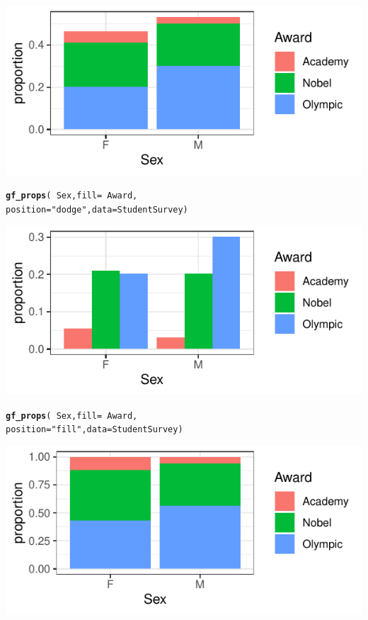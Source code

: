 \documentclass[10pt]{report}\usepackage[]{graphicx}\usepackage[]{xcolor}
\makeatletter
\newcommand{\hlsng}[1]{\textcolor[rgb]{0.192,0.494,0.8}{#1}}%
\newcommand{\hlopt}[1]{\textcolor[rgb]{0,0,0}{#1}}%
\newcommand{\hldef}[1]{\textcolor[rgb]{0.345,0.345,0.345}{#1}}%
\newcommand{\hlkwc}[1]{\textcolor[rgb]{0.333,0.667,0.333}{#1}}%
\newcommand{\hlkwd}[1]{\textcolor[rgb]{0.737,0.353,0.396}{\textbf{#1}}}%
\newenvironment{kframe}{%
 \def\at@end@of@kframe{}%
 \ifinner\ifhmode%
  \def\at@end@of@kframe{\end{minipage}}%
  \begin{minipage}{\columnwidth}%
 \fi\fi%
 \def\FrameCommand##1{\hskip\@totalleftmargin \hskip-\fboxsep
 \colorbox{shadecolor}{##1}\hskip-\fboxsep
     \hskip-\linewidth \hskip-\@totalleftmargin \hskip\columnwidth}%
 \MakeFramed {\advance\hsize-\width
   \@totalleftmargin\z@ \linewidth\hsize
   \@setminipage}}%
 {\par\unskip\endMakeFramed%
 \at@end@of@kframe}
\newenvironment{knitrout}{}{} %
\makeatother
\begin{document}
\begin{multicols}{3}
\begin{knitrout}
{\centering \includegraphics[width=.25\textwidth,height=.125\textwidth]{figure/unnamed-chunk-26-1} 

}


\end{knitrout}
\vspace*{-.20in}

\begin{knitrout}\small
{}\color{fgcolor}\begin{kframe}
\begin{alltt}
\hlkwd{gf_props}\hldef{(}\hlopt{~}\hldef{Sex,} \hlkwc{fill} \hldef{=} \hlopt{~}\hldef{Award,}
         \hlkwc{position} \hldef{=} \hlsng{"dodge"}\hldef{,} \hlkwc{data}\hldef{=StudentSurvey)}
\end{alltt}
\end{kframe}

{\centering \includegraphics[width=.25\textwidth,height=.125\textwidth]{figure/unnamed-chunk-27-1} 

}


\end{knitrout}
\columnbreak
\begin{knitrout}\small
{}\color{fgcolor}\begin{kframe}
\begin{alltt}
\hlkwd{gf_props}\hldef{(}\hlopt{~}\hldef{Sex,} \hlkwc{fill} \hldef{=} \hlopt{~}\hldef{Award,}
         \hlkwc{position} \hldef{=} \hlsng{"fill"}\hldef{,} \hlkwc{data}\hldef{=StudentSurvey)}
\end{alltt}
\end{kframe}

{\centering \includegraphics[width=.25\textwidth,height=.125\textwidth]{figure/unnamed-chunk-28-1} 

}
\end{knitrout}
\end{multicols}
\end{document}
